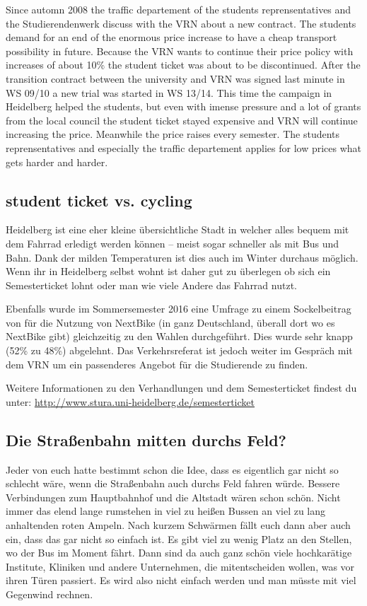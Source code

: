 Since automn 2008 the traffic departement of the students reprensentatives and the Studierendenwerk discuss with the VRN about a new contract. The students demand for an end of the enormous price increase to have a cheap transport possibility in future.
Because the VRN wants to continue their price policy with increases of about 10\% the student ticket was about to be discontinued.
After the transition contract between the university and VRN was signed last minute in WS 09/10 a new trial was started in WS 13/14. This time the campaign in Heidelberg helped the students, but even with imense pressure and a lot of grants from the local council the student ticket stayed expensive and VRN will continue increasing the price.
Meanwhile the price raises every semester. The students reprensentatives and especially the traffic departement applies for low prices what gets harder and harder.

\subsection{student ticket vs. cycling}

Heidelberg ist eine eher kleine übersichtliche Stadt in welcher alles bequem mit dem Fahrrad erledigt werden können -- meist sogar schneller als mit Bus und Bahn. Dank der milden Temperaturen ist dies auch im Winter durchaus möglich. Wenn ihr in Heidelberg selbst wohnt ist daher gut zu überlegen ob sich ein Semesterticket lohnt oder man wie viele Andere das Fahrrad nutzt.

Ebenfalls wurde im Sommersemester 2016 eine Umfrage zu einem Sockelbeitrag von  für die Nutzung von NextBike (in ganz Deutschland, überall dort wo es NextBike gibt) gleichzeitig zu den Wahlen durchgeführt. Dies wurde sehr knapp (52\% zu 48\%) abgelehnt. Das Verkehrsreferat ist jedoch weiter im Gespräch mit dem VRN um ein passenderes Angebot für die Studierende zu finden.

Weitere Informationen zu den Verhandlungen und dem Semesterticket findest du unter: \url{http://www.stura.uni-heidelberg.de/semesterticket}

\subsection{Die Straßenbahn mitten durchs Feld?}

Jeder von euch hatte bestimmt schon die Idee, dass es eigentlich gar nicht so schlecht wäre, wenn die Straßenbahn auch durchs Feld fahren würde. Bessere Verbindungen zum Hauptbahnhof und die Altstadt wären schon schön. Nicht immer das elend lange rumstehen in viel zu heißen Bussen an viel zu lang anhaltenden roten Ampeln. Nach kurzem Schwärmen fällt euch dann aber auch ein, dass das gar nicht so einfach ist. Es gibt viel zu wenig Platz an den Stellen, wo der Bus im Moment fährt. Dann sind da auch ganz schön viele hochkarätige Institute, Kliniken und andere Unternehmen, die mitentscheiden wollen, was vor ihren Türen passiert. Es wird also nicht einfach werden und man müsste mit viel Gegenwind rechnen.

